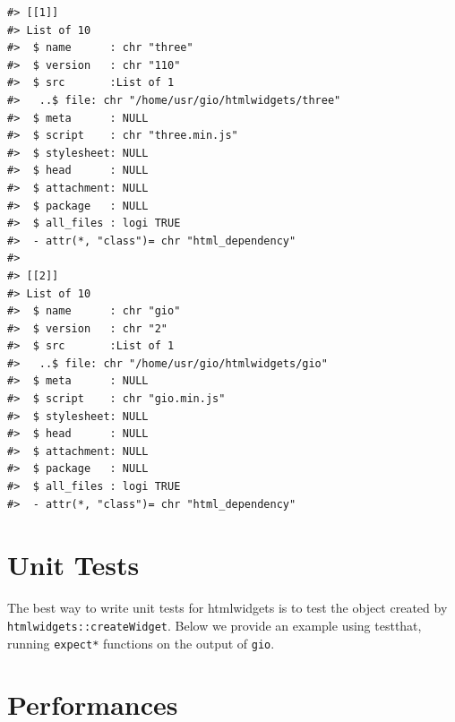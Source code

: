 \documentclass[10pt,]{krantz}
\makeatletter
\newenvironment{Shaded}{\begin{snugshade}}{\end{snugshade}}
\newcommand{\CommentTok}[1]{\textcolor[rgb]{0.37,0.37,0.37}{\textit{#1}}}
\newcommand{\KeywordTok}[1]{\textcolor[rgb]{0.27,0.27,0.27}{\textbf{#1}}}
\newcommand{\NormalTok}[1]{#1}
\newcommand{\OperatorTok}[1]{\textcolor[rgb]{0.43,0.43,0.43}{\textbf{#1}}}
\newcommand{\StringTok}[1]{\textcolor[rgb]{0.5,0.5,0.5}{#1}}
\newenvironment{kframe}{%
\medskip{}
\setlength{\fboxsep}{.8em}
 \def\at@end@of@kframe{}%
 \ifinner\ifhmode%
  \def\at@end@of@kframe{\end{minipage}}%
  \begin{minipage}{\columnwidth}%
 \fi\fi%
 \def\FrameCommand##1{\hskip\@totalleftmargin \hskip-\fboxsep
 \colorbox{shadecolor}{##1}\hskip-\fboxsep
     \hskip-\linewidth \hskip-\@totalleftmargin \hskip\columnwidth}%
 \MakeFramed {\advance\hsize-\width
   \@totalleftmargin\z@ \linewidth\hsize
   \@setminipage}}%
 {\par\unskip\endMakeFramed%
 \at@end@of@kframe}
\renewenvironment{Shaded}{\begin{kframe}}{\end{kframe}}
\makeatother
\begin{document}
\begin{verbatim}
#> [[1]]
#> List of 10
#>  $ name      : chr "three"
#>  $ version   : chr "110"
#>  $ src       :List of 1
#>   ..$ file: chr "/home/usr/gio/htmlwidgets/three"
#>  $ meta      : NULL
#>  $ script    : chr "three.min.js"
#>  $ stylesheet: NULL
#>  $ head      : NULL
#>  $ attachment: NULL
#>  $ package   : NULL
#>  $ all_files : logi TRUE
#>  - attr(*, "class")= chr "html_dependency"
#> 
#> [[2]]
#> List of 10
#>  $ name      : chr "gio"
#>  $ version   : chr "2"
#>  $ src       :List of 1
#>   ..$ file: chr "/home/usr/gio/htmlwidgets/gio"
#>  $ meta      : NULL
#>  $ script    : chr "gio.min.js"
#>  $ stylesheet: NULL
#>  $ head      : NULL
#>  $ attachment: NULL
#>  $ package   : NULL
#>  $ all_files : logi TRUE
#>  - attr(*, "class")= chr "html_dependency"
\end{verbatim}

\hypertarget{widgets-adv-unit-tests}{%
\section{Unit Tests}\label{widgets-adv-unit-tests}}

The best way to write unit tests for htmlwidgets is to test the object created by \texttt{htmlwidgets::createWidget}. Below we provide an example using testthat\citep{R-testthat}, running \texttt{expect*} functions on the output of \texttt{gio}.

\begin{Shaded}
\end{Shaded}

\hypertarget{widgets-adv-performances}{%
\section{Performances}\label{widgets-adv-performances}}
\end{document}
